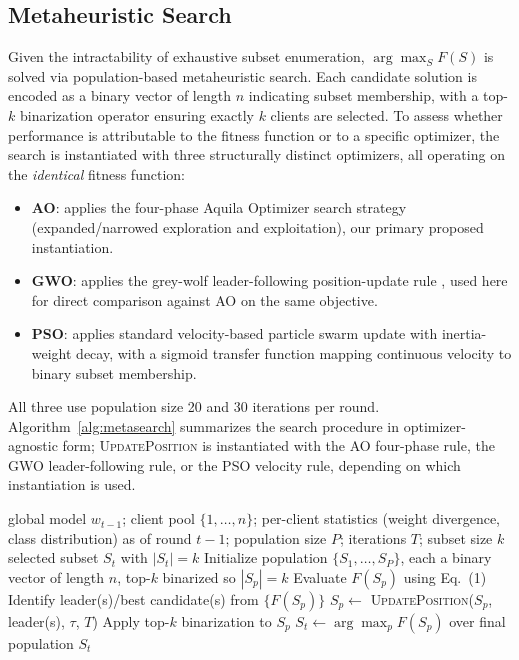 \documentclass[conference]{IEEEtran}
\begin{document}
\subsection{Metaheuristic Search}
Given the intractability of exhaustive subset enumeration, $\arg\max_S F(S)$ is solved via population-based metaheuristic search. Each candidate solution is encoded as a binary vector of length $n$ indicating subset membership, with a top-$k$ binarization operator ensuring exactly $k$ clients are selected. To assess whether performance is attributable to the fitness function or to a specific optimizer, the search is instantiated with three structurally distinct optimizers, all operating on the \emph{identical} fitness function:
\begin{itemize}
\setlength{\itemsep}{0pt}\setlength{\parskip}{0pt}
\item \textbf{AO}: applies the four-phase Aquila Optimizer search strategy (expanded/narrowed exploration and exploitation), our primary proposed instantiation.
\item \textbf{GWO}: applies the grey-wolf leader-following position-update rule \cite{mirjalili2014gwo}, used here for direct comparison against AO on the same objective.
\item \textbf{PSO}: applies standard velocity-based particle swarm update with inertia-weight decay, with a sigmoid transfer function mapping continuous velocity to binary subset membership.
\end{itemize}
All three use population size 20 and 30 iterations per round. Algorithm~\ref{alg:metasearch} summarizes the search procedure in optimizer-agnostic form; \textsc{UpdatePosition} is instantiated with the AO four-phase rule, the GWO leader-following rule, or the PSO velocity rule, depending on which instantiation is used.

\vspace{-4pt}
\begin{algorithm}[t]
\small
\caption{Metaheuristic Combinatorial Client Selection (one selection round)}
\label{alg:metasearch}
\begin{algorithmic}[1]
\REQUIRE global model $w_{t-1}$; client pool $\{1,\dots,n\}$; per-client statistics (weight divergence, class distribution) as of round $t-1$; population size $P$; iterations $T$; subset size $k$
\ENSURE selected subset $S_t$ with $|S_t|=k$
\STATE Initialize population $\{S_1,\dots,S_P\}$, each a binary vector of length $n$, top-$k$ binarized so $|S_p|=k$
\STATE Evaluate $F(S_p)$ using Eq.~(1)
\ENDFOR
\STATE Identify leader(s)/best candidate(s) from $\{F(S_p)\}$
\STATE $S_p \leftarrow$ \textsc{UpdatePosition}($S_p$, leader(s), $\tau$, $T$)
\STATE Apply top-$k$ binarization to $S_p$
\ENDFOR
\ENDFOR
\STATE $S_t \leftarrow \arg\max_p F(S_p)$ over final population
\RETURN $S_t$
\end{algorithmic}
\end{algorithm}
\end{document}
